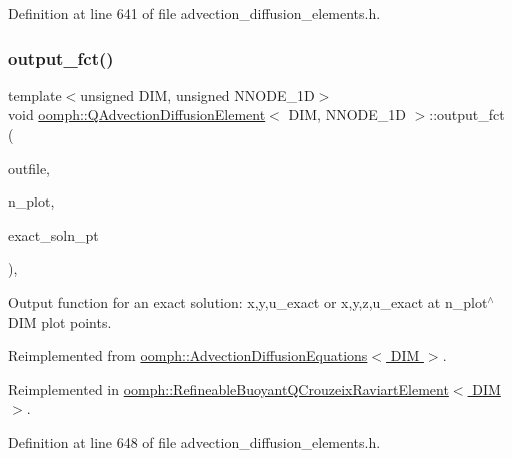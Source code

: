 Definition at line 641 of file advection\+\_\+diffusion\+\_\+elements.\+h.

\mbox{\label{classoomph_1_1QAdvectionDiffusionElement_a42d9f526bc4bcc8fe51c6dbb1d216b4c}} 
\subsubsection{\texorpdfstring{output\+\_\+fct()}{output\_fct()}\hspace{0.1cm}{\footnotesize\ttfamily [1/2]}}
{\footnotesize\ttfamily template$<$unsigned D\+IM, unsigned N\+N\+O\+D\+E\+\_\+1D$>$ \\
void \hyperlink{classoomph_1_1QAdvectionDiffusionElement}{oomph\+::\+Q\+Advection\+Diffusion\+Element}$<$ D\+IM, N\+N\+O\+D\+E\+\_\+1D $>$\+::output\+\_\+fct (\begin{DoxyParamCaption}\item[{std\+::ostream \&}]{outfile,  }\item[{const unsigned \&}]{n\+\_\+plot,  }\item[{\hyperlink{classoomph_1_1FiniteElement_a690fd33af26cc3e84f39bba6d5a85202}{Finite\+Element\+::\+Steady\+Exact\+Solution\+Fct\+Pt}}]{exact\+\_\+soln\+\_\+pt }\end{DoxyParamCaption})\hspace{0.3cm}{\ttfamily [inline]}, {\ttfamily [virtual]}}



Output function for an exact solution\+: x,y,u\+\_\+exact or x,y,z,u\+\_\+exact at n\+\_\+plot$^\wedge$\+D\+IM plot points. 



Reimplemented from \hyperlink{classoomph_1_1AdvectionDiffusionEquations_ab1d0f6bc8d3c9c9826ac1d71f1fd148f}{oomph\+::\+Advection\+Diffusion\+Equations$<$ D\+I\+M $>$}.



Reimplemented in \hyperlink{classoomph_1_1RefineableBuoyantQCrouzeixRaviartElement_a9f9feaf2d6003f2328741de2987fd0d1}{oomph\+::\+Refineable\+Buoyant\+Q\+Crouzeix\+Raviart\+Element$<$ D\+I\+M $>$}.



Definition at line 648 of file advection\+\_\+diffusion\+\_\+elements.\+h.

